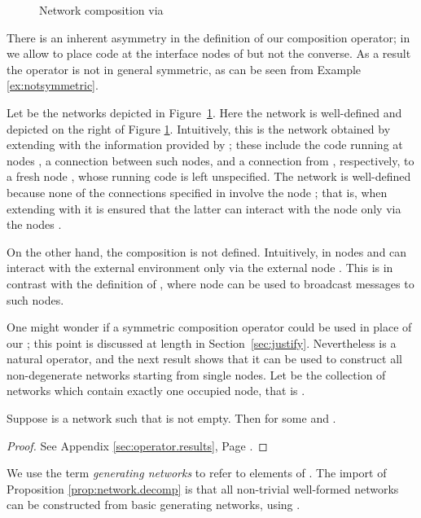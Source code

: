 \documentclass{LMCS}
\begin{document}
\begin{figure}[t]

  \caption{Network composition via \label{fig:notsymmetric}}
\end{figure}
There is an inherent asymmetry in the definition of our
composition operator; in  we allow  to
place code at the interface nodes of  but not the converse. As
a result the operator is not in general symmetric, as can be seen from
Example \ref{ex:notsymmetric}. 
\begin{exa}[ is asymmetric]
\label{ex:notsymmetric}
Let  be the networks depicted in Figure~\ref{fig:notsymmetric}. 
Here the network  is well-defined and 
depicted on the right of Figure \ref{fig:notsymmetric}. Intuitively, this is 
the network obtained by extending  with the information provided 
by ; these include the code running at nodes , a connection 
between such nodes, and a connection from , respectively, to a 
fresh node , whose running code is left unspecified. 
The network  is well-defined because 
none of the connections specified in  involve the node ; that is, when extending  with  it is ensured 
that the latter can interact with the node  only via the nodes . 

On the other hand, the composition  is not defined. Intuitively,  
in  nodes  and  can interact with the external environment only 
via the external node . This is in contrast 
with  the definition of , where node  can be used to broadcast messages 
to such nodes.
\end{exa}

One might wonder if a symmetric composition operator could be used in place of our 
; this point is discussed at length in Section~\ref{sec:justify}.
Nevertheless  is a natural operator, and the next result shows that it can be
used to construct all non-degenerate networks starting from single nodes. 
Let  be the collection of networks which contain exactly one occupied node, 
that is . 


\begin{prop}\label{prop:network.decomp}
  Suppose  is a network such that 
   is not empty.  Then  for some and .
\end{prop}
\begin{proof}
See Appendix \ref{sec:operator.results}, Page \pageref{proof:generators}.
\end{proof}
\noindent 
We use the term \emph{generating networks} to refer to elements of . 
The import of Proposition \ref{prop:network.decomp} is that all 
non-trivial well-formed networks can be constructed from basic generating 
networks, using . 
\end{document}
